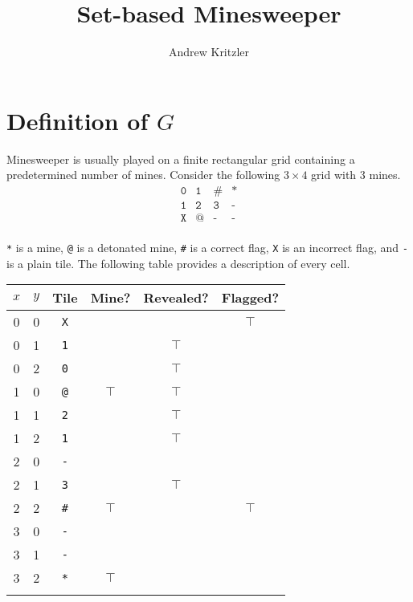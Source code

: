 \documentclass[12pt]{article}
\title{Set-based Minesweeper}
\author{Andrew Kritzler}
\begin{document}
\maketitle
\tableofcontents
\newpage


\section{Definition of \(G\)}

Minesweeper is usually played on a finite rectangular grid containing a predetermined number of mines.
Consider the following \(3 \times 4\) grid with 3 mines.
\[
    \begin{matrix}
        \texttt{0} & \texttt{1} & \texttt{\#} & \texttt{*} \\
        \texttt{1} & \texttt{2} & \texttt{3}  & \texttt{-} \\
        \texttt{X} & \texttt{@} & \texttt{-}  & \texttt{-} \\
    \end{matrix}
\]

\texttt{*} is a mine, \texttt{@} is a detonated mine, \texttt{\#} is a correct flag, \texttt{X} is an incorrect flag, and \texttt{-} is a plain tile.
The following table provides a description of every cell.
\begin{center}
    \begin{tabular}{*{6}{c}}
        \toprule
        \(x\) & \(y\) & Tile        & Mine?     & Revealed? & Flagged?  \\
        \midrule
        0     & 0     & \texttt{X}  &           &           & \(\top \) \\
        0     & 1     & \texttt{1}  &           & \(\top \) &           \\
        0     & 2     & \texttt{0}  &           & \(\top \) &           \\
        1     & 0     & \texttt{@}  & \(\top \) & \(\top \) &           \\
        1     & 1     & \texttt{2}  &           & \(\top \) &           \\
        1     & 2     & \texttt{1}  &           & \(\top \) &           \\
        2     & 0     & \texttt{-}  &           &           &           \\
        2     & 1     & \texttt{3}  &           & \(\top \) &           \\
        2     & 2     & \texttt{\#} & \(\top \) &           & \(\top \) \\
        3     & 0     & \texttt{-}  &           &           &           \\
        3     & 1     & \texttt{-}  &           &           &           \\
        3     & 2     & \texttt{*}  & \(\top \) &           &           \\
        \bottomrule                                                     \\
    \end{tabular}
\end{center}
\end{document}
